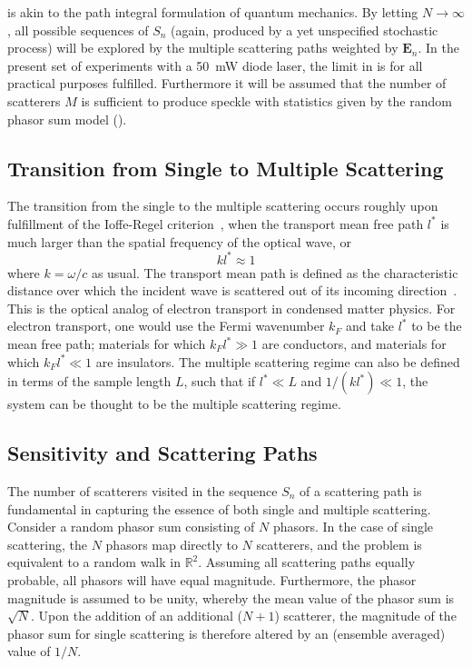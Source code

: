 is akin to the path integral formulation of
quantum mechanics.  By letting $N\to\infty$, all possible sequences of $S_n$
(again, produced by a yet unspecified stochastic process) will be explored by
the multiple scattering paths weighted by $\mathbf{E}_n$.  In the present set
of experiments with a \SI{50}{\milli\watt} diode laser, the limit in
 is for all practical purposes fulfilled.
Furthermore it will be assumed that the number of scatterers $M$ is sufficient
to produce speckle with statistics given by the random phasor sum model
().



\subsection{Transition from Single to Multiple Scattering}
The transition from the single to the multiple scattering occurs roughly upon
fulfillment of the Ioffe-Regel criterion~\cite{ioffe1960non}, when the
transport mean free path $l^*$ is much larger than the spatial frequency of
the optical wave, or
\begin{equation}
k l^* \approx 1
\end{equation}
where $k=\omega/c$ as usual.  The transport mean path is defined as the
characteristic distance over which the incident wave is scattered out of its
incoming direction~\cite{berkovits1994correlations}.  This is the optical
analog of electron transport in condensed matter physics.  For electron transport, one would
use the Fermi wavenumber $k_F$ and take $l^*$ to be the mean free path;
materials for which $k_F l^* \gg 1$ are conductors, and materials for which
$k_F l^* \ll 1$ are insulators.  The multiple scattering regime can also be
defined in terms of the sample length $L$, such that if $l^* \ll L$ and $1/(k
l^*) \ll 1$, the system can be thought to be the multiple scattering regime.

\subsection{Sensitivity and Scattering Paths}
\label{sec:senspaths}
The number of scatterers visited in the sequence $S_n$ of a scattering path is
fundamental in capturing the essence of both single and multiple scattering.
Consider a random phasor sum consisting of $N$ phasors.  In the case of single
scattering, the $N$ phasors map directly to $N$ scatterers, and the problem is
equivalent to a random walk in $\mathbb{R}^2$.  Assuming all scattering paths
equally probable, all phasors will have equal magnitude.  Furthermore, the
phasor magnitude is assumed to be unity, whereby the mean value of the phasor
sum is $\sqrt{N}$.  Upon the addition of an additional ($N+1$) scatterer, the
magnitude of the phasor sum for single scattering is therefore altered by an
(ensemble averaged) value of $1/N$.

